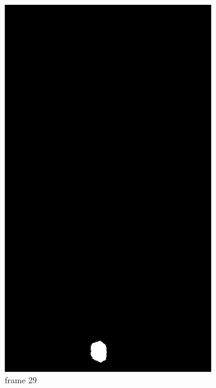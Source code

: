 \documentclass[12pt,a4paper]{article}
\begin{document}
\begin{figure}[htb]
\begin{subfigure}[h!]{0.3\textwidth}
		\includegraphics[width=\textwidth]{7296/28.png}
		\caption{frame 29}
	\end{subfigure}
	\begin{subfigure}[h!]{0.3\textwidth}
		\centering

\end{subfigure}
\end{figure}
\end{document}
